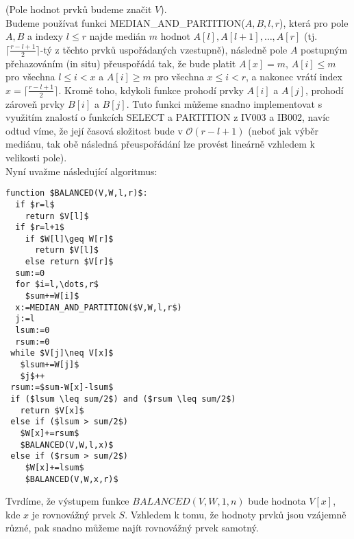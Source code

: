 \documentclass[12pt,a4paper]{article}
\theoremstyle{plain}
\begin{document}
\pagestyle{fancy}                      %
\fancyhf{}                             %
\addtolength{\topmargin}{-30 pt}                   %
\setlength{\headsep}{10 pt}                      %
\renewcommand{\headrulewidth}{1 pt}                %

(Pole hodnot prvků budeme značit $V$).\\

Budeme používat funkci MEDIAN\_AND\_PARTITION($A,B,l,r$), která pro pole $A,B$ a indexy $l\leq r$ najde medián $m$ hodnot $A[l],A[l+1],\dots,A[r]$ (tj. $\lceil \frac{r-l+1}{2}\rceil$-tý z těchto prvků uspořádaných vzestupně), následně pole $A$ postupným přehazováním (in situ) přeuspořádá tak, že bude platit $A[x]=m$, $A[i]\leq m$ pro všechna $l\leq i< x$ a $A[i]\geq m$ pro všechna $x\leq i< r$, a nakonec vrátí index $x=\lceil \frac{r-l+1}{2}\rceil$. Kromě toho, kdykoli funkce prohodí prvky $A[i]$ a $A[j]$, prohodí zároveň prvky $B[i]$ a $B[j]$. Tuto funkci můžeme snadno implementovat s využitím znalostí o funkcích SELECT a PARTITION z IV003 a IB002, navíc odtud víme, že její časová složitost bude v $\mathcal{O}(r-l+1)$ (neboť jak výběr mediánu, tak obě následná přeuspořádání lze provést lineárně vzhledem k velikosti pole).\\

Nyní uvažme následující algoritmus:
\begin{lstlisting}[mathescape]
function $BALANCED(V,W,l,r)$:
  if $r=l$
    return $V[l]$
  if $r=l+1$
    if $W[l]\geq W[r]$
      return $V[l]$
    else return $V[r]$
  sum:=0
  for $i=l,\dots,r$
    $sum+=W[i]$
  x:=MEDIAN_AND_PARTITION($V,W,l,r$)
  j:=l
  lsum:=0
  rsum:=0
 while $V[j]\neq V[x]$
   $lsum+=W[j]$
   $j$++
 rsum:=$sum-W[x]-lsum$
 if ($lsum \leq sum/2$) and ($rsum \leq sum/2$)
   return $V[x]$
 else if ($lsum > sum/2$)
   $W[x]+=rsum$
   $BALANCED(V,W,l,x)$
 else if ($rsum > sum/2$)
    $W[x]+=lsum$
    $BALANCED(V,W,x,r)$
\end{lstlisting}

Tvrdíme, že výstupem funkce $BALANCED(V,W,1,n)$ bude hodnota $V[x]$, kde $x$ je rovnovážný prvek $S$. Vzhledem k tomu, že hodnoty prvků jsou vzájemně různé, pak snadno můžeme najít rovnovážný prvek samotný.\\
\end{document}
